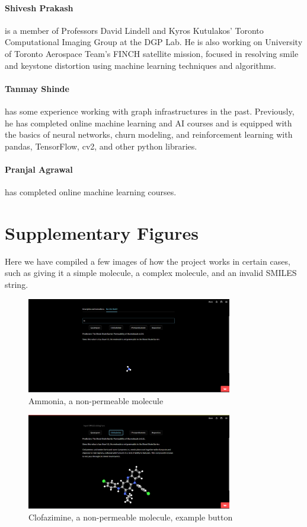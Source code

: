 \documentclass[fontsize=11pt]{article}
\begin{document}
\paragraph{Shivesh Prakash} is a member of Professors David Lindell and Kyros Kutulakos' Toronto Computational Imaging Group at the DGP Lab. He is also working on University of Toronto Aerospace Team's FINCH satellite mission, focused in resolving smile and keystone distortion using machine learning techniques and algorithms.

\paragraph{Tanmay Shinde} has some experience working with graph infrastructures in the past. Previously, he has completed online machine learning and AI courses and is equipped with the basics of neural networks, churn modeling, and reinforcement learning with pandas, TensorFlow, cv2, and other python libraries. 

\paragraph{Pranjal Agrawal} has completed online machine learning courses.

\section*{Supplementary Figures}

Here we have compiled a few images of how the project works in certain cases, such as giving it a simple molecule, a complex molecule, and an invalid SMILES string.
\begin{figure}[h!]
    \centering
    \includegraphics[width=0.8\textwidth]{ammonia_simple.png}
    \caption{Ammonia, a non-permeable molecule}
    \label{fig:ammonia}
\end{figure}

\begin{figure}[h!]
    \centering
    \includegraphics[width=0.8\textwidth]{example_clofazimine.png}
    \caption{Clofazimine, a non-permeable molecule, example button}
    \label{fig:clofazimine}
\end{figure}
\end{document}
